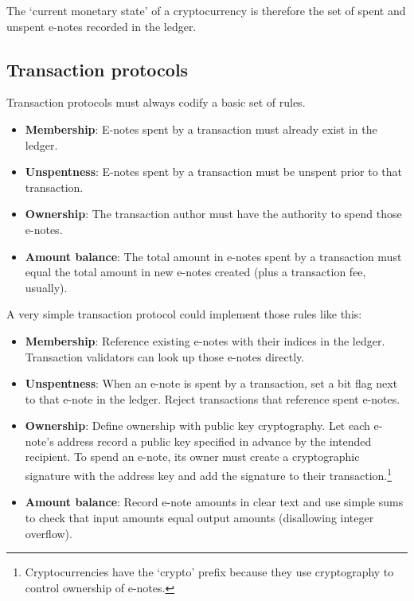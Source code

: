 The `current monetary state' of a cryptocurrency is therefore the set of spent and unspent e-notes recorded in the ledger.


\subsection{Transaction protocols}
\label{subsec:intro-transaction protocols}

Transaction protocols must always codify a basic set of rules.

\begin{itemize}
    \item \textbf{Membership}: E-notes spent by a transaction must already exist in the ledger.
    \item \textbf{Unspentness}: E-notes spent by a transaction must be unspent prior to that transaction.
    \item \textbf{Ownership}: The transaction author must have the authority to spend those e-notes.
    \item \textbf{Amount balance}: The total amount in e-notes spent by a transaction must equal the total amount in new e-notes created (plus a transaction fee, usually).
\end{itemize}

A very simple transaction protocol could implement those rules like this:

\begin{itemize}
    \item \textbf{Membership}: Reference existing e-notes with their indices in the ledger. Transaction validators can look up those e-notes directly.
    \item \textbf{Unspentness}: When an e-note is spent by a transaction, set a bit flag next to that e-note in the ledger. Reject transactions that reference spent e-notes.
    \item \textbf{Ownership}: Define ownership with public key cryptography. Let each e-note's address record a public key specified in advance by the intended recipient. To spend an e-note, its owner must create a cryptographic signature with the address key and add the signature to their transaction.\footnote{Cryptocurrencies have the `crypto' prefix because they use cryptography to control ownership of e-notes.}
    \item \textbf{Amount balance}: Record e-note amounts in clear text and use simple sums to check that input amounts equal output amounts (disallowing integer overflow).
\end{itemize}

